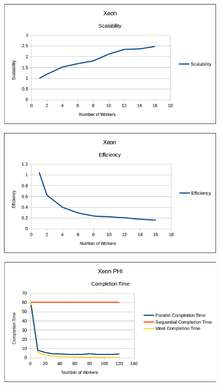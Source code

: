 \documentclass[10pt]{article}
\numberwithin{equation}{section}
\begin{document}
\begin{figure} 
\centering
\includegraphics[scale=.75]{Xeon_Scalability.png}
\label{fig:xeonscalability}
\end{figure}

\begin{figure} 
\centering
\includegraphics[scale=.75]{Xeon_Efficiency.png}
\label{fig:xeonefficiency}
\end{figure}

\begin{figure} 
	\centering
	\includegraphics[scale=.75]{XeonPHI_CompletionTime.png}
	\label{fig:xeonphicompletiontime}
\end{figure}
\end{document}

